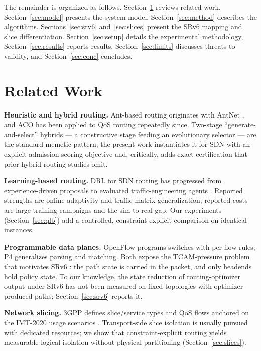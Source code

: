 \documentclass[journal]{IEEEtran}
\begin{document}
The remainder is organized as follows.
Section~\ref{sec:related} reviews related work.
Section~\ref{sec:model} presents the system model.
Section~\ref{sec:method} describes the algorithms.
Sections~\ref{sec:srv6} and~\ref{sec:slices} present the SRv6 mapping and
slice differentiation.
Section~\ref{sec:setup} details the experimental methodology,
Section~\ref{sec:results} reports results, Section~\ref{sec:limits} discusses
threats to validity, and Section~\ref{sec:conc} concludes.

\section{Related Work}
\label{sec:related}
\textbf{Heuristic and hybrid routing.} Ant-based routing originates with
AntNet \cite{dorigo2004}, and ACO has been applied to QoS routing
repeatedly since. Two-stage ``generate-and-select'' hybrids --- a constructive
stage feeding an evolutionary selector --- are the standard memetic pattern;
the present work instantiates it for SDN with an explicit admission-scoring
objective and, critically, adds exact certification that prior hybrid-routing
studies omit.

\textbf{Learning-based routing.} DRL for SDN routing has progressed from
experience-driven proposals \cite{xu2018experience,stampa2017drl} to
evaluated traffic-engineering agents \cite{almasan2022drl}. Reported
strengths are online adaptivity and traffic-matrix generalization; reported
costs are large training campaigns and the sim-to-real gap. Our experiments
(Section~\ref{sec:qlb}) add a controlled, constraint-explicit comparison on
identical instances.

\textbf{Programmable data planes.} OpenFlow \cite{mckeown2008} programs
switches with per-flow rules; P4 \cite{bosshart2014} generalizes parsing and
matching. Both expose the TCAM-pressure problem that motivates SRv6
\cite{rfc8402,rfc8754,rfc8986,rfc9256}: the path state is carried in the
packet, and only headends hold policy state. To our knowledge, the state
reduction of routing-optimizer output under SRv6 has not been measured on
fixed topologies with optimizer-produced paths; Section~\ref{sec:srv6}
reports it.

\textbf{Network slicing.} 3GPP defines slice/service types and QoS flows
\cite{3gpp-ts23501} anchored on the IMT-2020 usage scenarios
\cite{itu-m2083}. Transport-side slice isolation is usually pursued with
dedicated resources; we show that constraint-explicit routing yields
measurable logical isolation without physical partitioning
(Section~\ref{sec:slices}).
\end{document}
